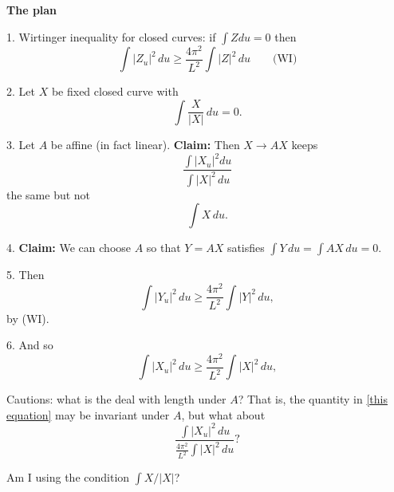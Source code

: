 \documentclass{amsart}
\begin{document}
\textbf{The plan}
 
 1.  Wirtinger inequality for closed curves:  if $\int Z du =0$ then 
 $$\int |Z_u|^2 \,du \ge \frac{4\pi^2}{L^2}\int |Z|^2 \,du  \quad \quad \text{(WI)}$$
 
 2.  Let $X$ be fixed closed curve with $$\int \frac{X}{|X|}\,du =0.$$
 
 3.  Let $A$ be affine (in fact linear).  \textbf{Claim: }Then $X\rightarrow AX$ keeps 
 \begin{equation}\frac{\int |X_u|^2 du }{\int |X|^2 \,du}  \label{this equation} \end{equation}
 the same but not $$\int X\,du.$$
 
 4.   \textbf{Claim:} We can choose $A$ so that $Y=AX$ satisfies $\int Y \,du =\int AX\,du=0.$
 
 5.  Then $$\int |Y_u|^2 \,du \ge \frac{4\pi^2}{L^2}\int {|Y|^2}\,du,$$ by (WI).
 
 6.  And so $$\int |X_u|^2 \,du \ge \frac{4\pi^2}{L^2}\int {|X|^2}\,du,$$


Cautions:  what is the deal with length under $A$? That is, the quantity in \eqref{this equation} may be invariant under $A$, but what about
\begin{equation}\frac{ \int |{X}_u|^2 \,du}{ \frac{4\pi^2}{L^2}\int |{X}|^2\,du } ? \end{equation}

Am I using the condition $\int X/|X|$?
\end{document}
